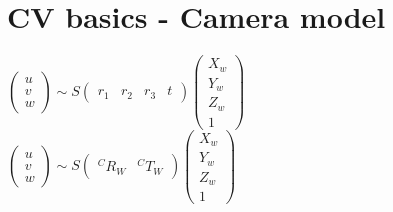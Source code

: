 \section{CV basics - Camera model}
$\begin{pmatrix} u\\ v\\ w\end{pmatrix} \sim
S \begin{pmatrix}r_1 & r_2 & r_3 & t \end{pmatrix}
\begin{pmatrix} X_w \\ Y_w \\ Z_w \\ 1\end{pmatrix}$ \\
$\begin{pmatrix} u\\ v\\ w\end{pmatrix} \sim
S \begin{pmatrix} ^C R_W & ^C T_W \end{pmatrix}
\begin{pmatrix} X_w \\ Y_w \\ Z_w \\ 1\end{pmatrix}$ \\

